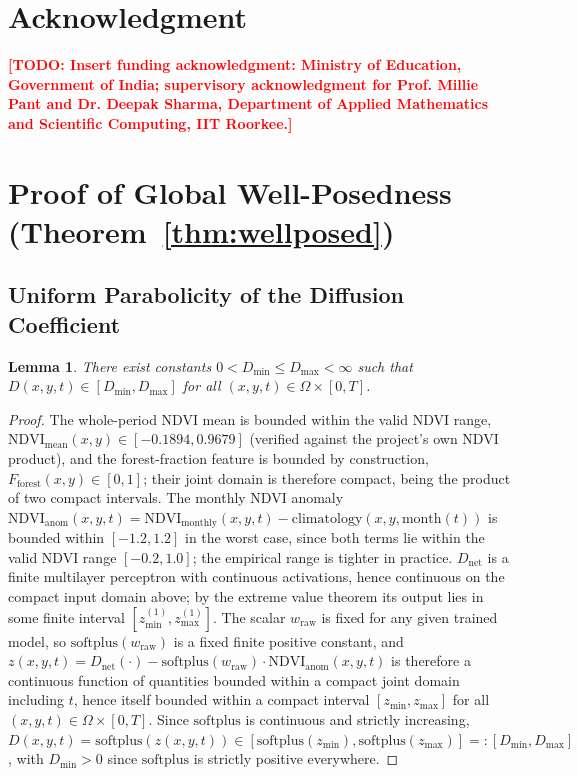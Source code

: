 \documentclass[journal]{IEEEtran}
\newtheorem{lemma}{Lemma}
\newcommand{\todo}[1]{\textcolor{red}{\textbf{[TODO: #1]}}}
\begin{document}
\section*{Acknowledgment}
\todo{Insert funding acknowledgment: Ministry of Education, Government of India; supervisory acknowledgment for Prof. Millie Pant and Dr. Deepak Sharma, Department of Applied Mathematics and Scientific Computing, IIT Roorkee.}




\appendices

\section{Proof of Global Well-Posedness (Theorem~\ref{thm:wellposed})}

\subsection{Uniform Parabolicity of the Diffusion Coefficient}
\label{app:diffusion}

\begin{lemma}
\label{lem:D_bounds}
There exist constants $0<D_{\min}\leq D_{\max}<\infty$ such that $D(x,y,t)\in[D_{\min},D_{\max}]$ for all $(x,y,t)\in\Omega\times[0,T]$.
\end{lemma}

\begin{proof}
The whole-period NDVI mean is bounded within the valid NDVI range, $\mathrm{NDVI}_{\mathrm{mean}}(x,y)\in[-0.1894,0.9679]$ (verified against the project's own NDVI product), and the forest-fraction feature is bounded by construction, $F_{\mathrm{forest}}(x,y)\in[0,1]$; their joint domain is therefore compact, being the product of two compact intervals. The monthly NDVI anomaly $\mathrm{NDVI}_{\mathrm{anom}}(x,y,t)=\mathrm{NDVI}_{\mathrm{monthly}}(x,y,t)-\mathrm{climatology}(x,y,\mathrm{month}(t))$ is bounded within $[-1.2,1.2]$ in the worst case, since both terms lie within the valid NDVI range $[-0.2,1.0]$; the empirical range is tighter in practice. $D_{\mathrm{net}}$ is a finite multilayer perceptron with continuous activations, hence continuous on the compact input domain above; by the extreme value theorem its output lies in some finite interval $[z^{(1)}_{\min},z^{(1)}_{\max}]$. The scalar $w_{\mathrm{raw}}$ is fixed for any given trained model, so $\mathrm{softplus}(w_{\mathrm{raw}})$ is a fixed finite positive constant, and $z(x,y,t)=D_{\mathrm{net}}(\cdot)-\mathrm{softplus}(w_{\mathrm{raw}})\cdot\mathrm{NDVI}_{\mathrm{anom}}(x,y,t)$ is therefore a continuous function of quantities bounded within a compact joint domain including $t$, hence itself bounded within a compact interval $[z_{\min},z_{\max}]$ for all $(x,y,t)\in\Omega\times[0,T]$. Since $\mathrm{softplus}$ is continuous and strictly increasing, $D(x,y,t)=\mathrm{softplus}(z(x,y,t))\in[\mathrm{softplus}(z_{\min}),\mathrm{softplus}(z_{\max})]=:[D_{\min},D_{\max}]$, with $D_{\min}>0$ since $\mathrm{softplus}$ is strictly positive everywhere.
\end{proof}
\end{document}
